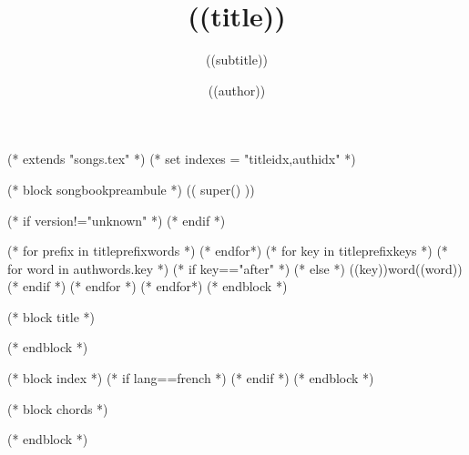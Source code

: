 (* extends "songs.tex" *)
(* set indexes = "titleidx,authidx" *)

(* block songbookpreambule *)
   (( super() ))

  \usepackage{chords}

   \title{((title))}
   \author{((author))}
   \subtitle{((subtitle))}
   (* if version!="unknown" *)
   (* endif *)


   (* for prefix in titleprefixwords *)
   (* endfor*)
   (* for key in titleprefixkeys *)
      (* for word in authwords.key *)
      (* if key=="after" *)
      (* else *)
      \auth((key))word{((word))}
      (* endif *)
      (* endfor *)
   (* endfor*)
(* endblock *)

(* block title *)
\maketitle
(* endblock *)

(* block index *)
   (* if lang==french *)
   (* endif *)
(* endblock *)

(* block chords *)
   \ifchorded
   \chords
   \fi
(* endblock *)

